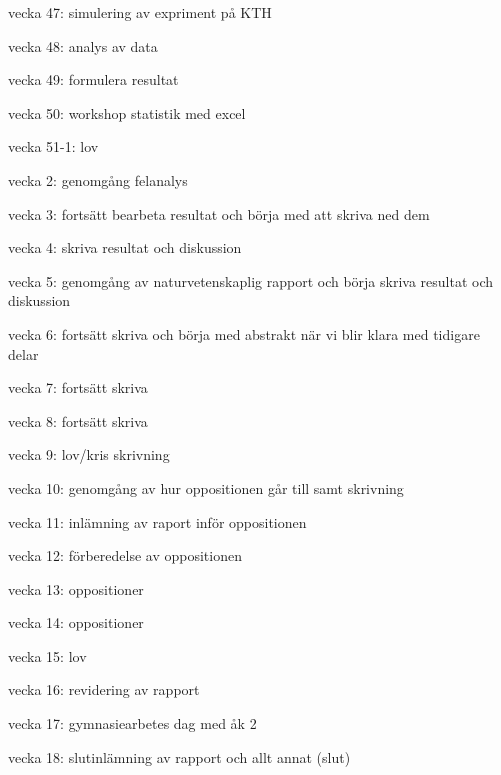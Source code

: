 vecka 47: simulering av expriment på KTH

vecka 48: analys av data

vecka 49: formulera resultat

vecka 50: workshop statistik med excel

vecka 51-1: lov

vecka 2: genomgång felanalys

vecka 3: fortsätt bearbeta resultat och börja med att skriva ned dem

vecka 4: skriva resultat och diskussion

vecka 5: genomgång av naturvetenskaplig rapport och börja skriva resultat och diskussion

vecka 6: fortsätt skriva och börja med abstrakt när vi blir klara med tidigare delar

vecka 7: fortsätt skriva

vecka 8: fortsätt skriva

vecka 9: lov/kris skrivning

vecka 10: genomgång av hur oppositionen går till samt skrivning

vecka 11: inlämning av raport inför oppositionen

vecka 12: förberedelse av oppositionen

vecka 13: oppositioner

vecka 14: oppositioner

vecka 15: lov

vecka 16: revidering av rapport

vecka 17: gymnasiearbetes dag med åk 2

vecka 18: slutinlämning av rapport och allt annat (slut)